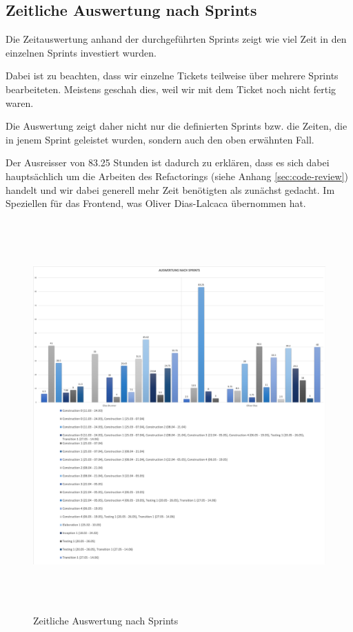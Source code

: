 \subsection{Zeitliche Auswertung nach Sprints}
Die Zeitauswertung anhand der durchgeführten Sprints zeigt wie viel Zeit in den einzelnen Sprints investiert wurden.

Dabei ist zu beachten, dass wir einzelne Tickets teilweise über mehrere Sprints bearbeiteten. Meistens geschah dies, weil wir mit dem Ticket noch nicht fertig waren.

Die Auswertung zeigt daher nicht nur die definierten Sprints bzw. die Zeiten, die in jenem Sprint geleistet wurden, sondern auch den oben erwähnten Fall.

Der Ausreisser von 83.25 Stunden ist dadurch zu erklären, dass es sich dabei hauptsächlich um die Arbeiten des Refactorings (siehe Anhang \ref{sec:code-review}) handelt und wir dabei generell mehr Zeit benötigten als zunächst gedacht. Im Speziellen für das Frontend, was Oliver Dias-Lalcaca übernommen hat.

\begin{figure}[h]
  \centering
  \includegraphics[width=1\linewidth, height=15cm]{./img/zeitauswertung/ZeitauswertungSprints}
  \caption{Zeitliche Auswertung nach Sprints}
  \label{fig:comparison-sprints}
\end{figure}

